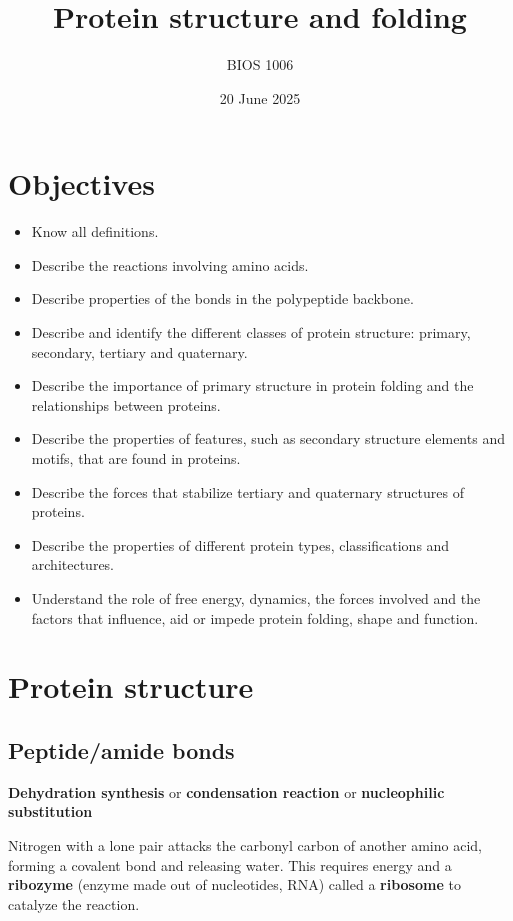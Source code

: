 \documentclass[letterpaper, 12pt]{article}
\title{Protein structure and folding}
\author{BIOS 1006}
\date{20 June 2025}
\begin{document}
\maketitle

\section*{Objectives}

\begin{itemize}
\item Know all definitions.
\item Describe the reactions involving amino acids.
\item Describe properties of the bonds in the polypeptide backbone.
\item Describe and identify the different classes of protein structure: primary, secondary, tertiary and quaternary.
\item Describe the importance of primary structure in protein folding and the relationships between proteins.
\item Describe the properties of features, such as secondary structure elements and motifs, that are found in proteins.
\item Describe the forces that stabilize tertiary and quaternary structures of proteins.
\item Describe the properties of different protein types, classifications and architectures.
\item Understand the role of free energy, dynamics, the forces involved and the factors that influence, aid or impede protein folding, shape and function.
\end{itemize}

\newpage

\section*{Protein structure}

\subsection*{Peptide/amide bonds}

\textbf{Dehydration synthesis} or \textbf{condensation reaction} or \textbf{nucleophilic substitution}

Nitrogen with a lone pair attacks the carbonyl carbon of another amino acid, forming a covalent bond and releasing water. This requires energy and a \textbf{ribozyme} (enzyme made out of nucleotides, RNA) called a \textbf{ribosome} to catalyze the reaction.
\end{document}
